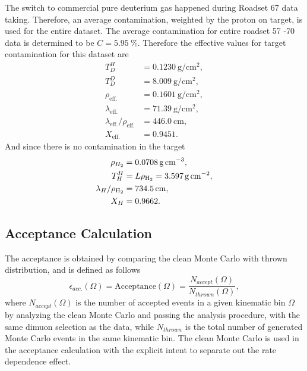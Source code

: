 \documentclass[../main.tex]{subfiles}
\begin{document}
The switch to commercial pure deuterium gas happened during Roadset 67 data taking. Therefore,
an average contamination, weighted by the proton on target, is used for the entire dataset.
The average contamination for entire roadset 57 -70 data is determined to be $C=\SI{5.95}{\percent}$.
Therefore the effective values for target contamination for this dataset are
\begin{equation}
	\begin{split}
		T_D^H &= \SI{0.1230}{\g\per\cm\squared}, \\
		T_D^D &= \SI{8.009}{\g\per\cm\squared},\\
		\rho_{\mathrm{eff.}} & = \SI{0.1601}{\g\per\cm\squared},\\
		\lambda_{\mathrm{eff.}} &= \SI{71.39}{\g\per\cm\squared},\\
		\lambda_{\mathrm{eff.}}/\rho_{\mathrm{eff.}} &= \SI{446.0}{\cm},\\
		X_{\mathrm{eff.}} &= 0.9451.
	\end{split}
\end{equation}
And since there is no contamination in the  target
\begin{equation}
	\begin{split}
		\rho_{H_2} &= \SI{0.0708}{\g\per\cm\cubed},\\
		T_H^H &= L\rho_{\ce{H_2}} = \SI{3.597}{\g\per\cm\squared},\\
		\lambda_H/\rho_{\ce{H_2}} &= \SI{734.5}{\cm},\\
		X_H &=0.9662.
	\end{split}
\end{equation}


\subsection{Acceptance Calculation}
The acceptance is obtained by comparing the clean Monte Carlo with thrown distribution,
and is defined as follows
\begin{equation}
	\epsilon_{acc.}\left(\Omega\right)=\mathrm{Acceptance}\left(\Omega\right)= \frac{N_{accept}\left(\Omega\right)}{N_{thrown}\left(\Omega\right)},
\end{equation}
where $N_{accept}\left(\Omega\right)$ is the number of accepted events in a given kinematic bin $\Omega$
by analyzing the clean Monte Carlo and passing the analysis procedure, with the same dimuon selection
as the data, while $N_{thrown}$ is the total number of generated Monte Carlo events in the same kinematic bin. 
The clean Monte Carlo is used in the acceptance calculation with the explicit intent to separate out the
rate dependence effect.
\end{document}
